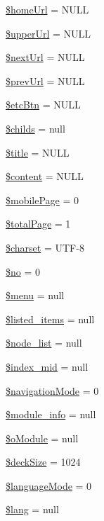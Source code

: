 \begin{DoxyCompactItemize}
\item 
\hyperlink{classmobileXE_abff078bb36c02394447e55be4500b762}{\$home\+Url} = N\+U\+LL
\item 
\hyperlink{classmobileXE_a643b9ca5393066afea26819e4f1cf115}{\$upper\+Url} = N\+U\+LL
\item 
\hyperlink{classmobileXE_adbdb5909b975bb776f91817d2392aaca}{\$next\+Url} = N\+U\+LL
\item 
\hyperlink{classmobileXE_acbc08c3fe06a6a5aaae6cbdc8738559f}{\$prev\+Url} = N\+U\+LL
\item 
\hyperlink{classmobileXE_adac4ec3b5f46d10ac063ccba83f8ffa7}{\$etc\+Btn} = N\+U\+LL
\item 
\hyperlink{classmobileXE_ae641a3f98d4d95afe77f56456532aff7}{\$childs} = null
\item 
\hyperlink{classmobileXE_aeb2ef82029883fd60174e3d0e9f7dcc3}{\$title} = N\+U\+LL
\item 
\hyperlink{classmobileXE_a827bc8119bac862a05a1c192125bf125}{\$content} = N\+U\+LL
\item 
\hyperlink{classmobileXE_a4017307825d19d450c677b25b70eab5e}{\$mobile\+Page} = 0
\item 
\hyperlink{classmobileXE_a0d7bcada3689f84f67337d02c8dd6f21}{\$total\+Page} = 1
\item 
\hyperlink{classmobileXE_ae49d948fe651953a56bac2a907f6057a}{\$charset} = \textquotesingle{}U\+TF-\/8\textquotesingle{}
\item 
\hyperlink{classmobileXE_a497e828014cdb6eaef56dd42d0f816e6}{\$no} = 0
\item 
\hyperlink{classmobileXE_a0ebb4296d28c9cb49fabb4d1252c1434}{\$menu} = null
\item 
\hyperlink{classmobileXE_abd07e5909154b43a31e2ebff5d51e4c7}{\$listed\+\_\+items} = null
\item 
\hyperlink{classmobileXE_af906479c52f412d0beae2252bad4ef35}{\$node\+\_\+list} = null
\item 
\hyperlink{classmobileXE_a9e93ed38eed50085338e8128ab4015ab}{\$index\+\_\+mid} = null
\item 
\hyperlink{classmobileXE_aa6e85b2d6fe4667d7d0a3a2b3f13bd12}{\$navigation\+Mode} = 0
\item 
\hyperlink{classmobileXE_a926916a0195e056ccfdaf284e56b0ea6}{\$module\+\_\+info} = null
\item 
\hyperlink{classmobileXE_a64908b5e1d46537b4739036b1a00b689}{\$o\+Module} = null
\item 
\hyperlink{classmobileXE_a3d9450dc37a10f7bb11801ab29c000ed}{\$deck\+Size} = 1024
\item 
\hyperlink{classmobileXE_a70ee01279ea1bcdd609905e80e4544b7}{\$language\+Mode} = 0
\item 
\hyperlink{classmobileXE_a126d781fe75edb57ef2718f5a6e26d82}{\$lang} = null
\end{DoxyCompactItemize}


